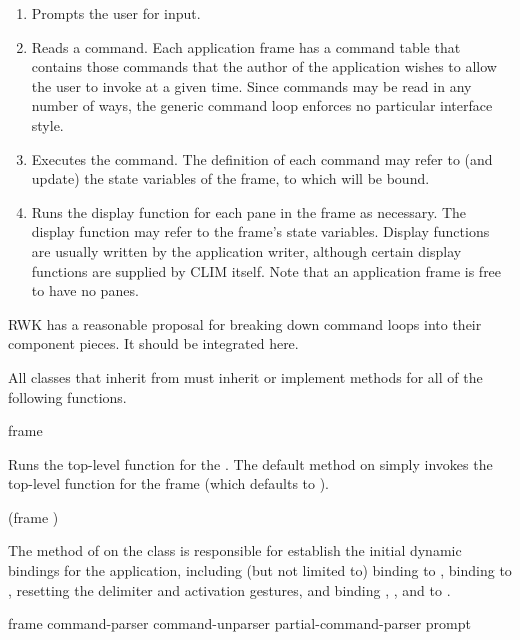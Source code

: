 \begin{enumerate}
\item Prompts the user for input.

\item Reads a command.  Each application frame has a command table that contains
those commands that the author of the application wishes to allow the user to
invoke at a given time.  Since commands may be read in any number of ways, the
generic command loop enforces no particular interface style.

\item Executes the command.  The definition of each command may refer to (and
update) the state variables of the frame, to which  will
be bound.

\item Runs the display function for each pane in the frame as necessary.  The
display function may refer to the frame's state variables.  Display functions
are usually written by the application writer, although certain display
functions are supplied by CLIM itself.  Note that an application frame is free
to have no panes.
\end{enumerate}


 {RWK has a reasonable proposal for breaking down command loops into
their component pieces.  It should be integrated here.}

All classes that inherit from  must inherit or implement
methods for all of the following functions.


 {frame \key \allow}

Runs the top-level function for the  .  The default
method on  simply invokes the top-level function for the
frame (which defaults to ).

 {(frame ) \key}

The  method of  on the
 class is responsible for establish the initial dynamic
bindings for the application, including (but not limited to) binding
 to , binding  to
, resetting the delimiter and activation gestures, and binding
, , and
 to .


 {frame \key command-parser command-unparser
                                                  partial-command-parser
                                                  prompt}

